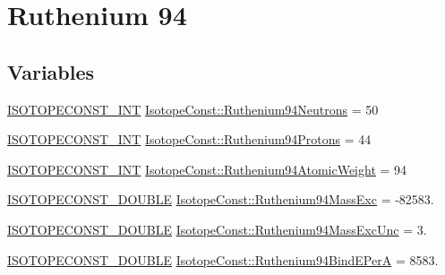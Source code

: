 \hypertarget{group___isotope_const-_ruthenium-_ru94}{}\section{Ruthenium 94}
\label{group___isotope_const-_ruthenium-_ru94}
\subsection*{Variables}
\begin{DoxyCompactItemize}
\item 
\mbox{\hyperlink{group___isotope_const-_macros_ga5f18360b3e99483a35c32d789e62621c}{I\+S\+O\+T\+O\+P\+E\+C\+O\+N\+S\+T\+\_\+\+I\+NT}} \mbox{\hyperlink{group___isotope_const-_ruthenium-_ru94_gad4b92330cacf5779d1186abbbd93e342}{Isotope\+Const\+::\+Ruthenium94\+Neutrons}} = 50
\item 
\mbox{\hyperlink{group___isotope_const-_macros_ga5f18360b3e99483a35c32d789e62621c}{I\+S\+O\+T\+O\+P\+E\+C\+O\+N\+S\+T\+\_\+\+I\+NT}} \mbox{\hyperlink{group___isotope_const-_ruthenium-_ru94_gac88748f72ea067de16aff702333e3f34}{Isotope\+Const\+::\+Ruthenium94\+Protons}} = 44
\item 
\mbox{\hyperlink{group___isotope_const-_macros_ga5f18360b3e99483a35c32d789e62621c}{I\+S\+O\+T\+O\+P\+E\+C\+O\+N\+S\+T\+\_\+\+I\+NT}} \mbox{\hyperlink{group___isotope_const-_ruthenium-_ru94_gada849ba17ad02c38a521cd3742804a36}{Isotope\+Const\+::\+Ruthenium94\+Atomic\+Weight}} = 94
\item 
\mbox{\hyperlink{group___isotope_const-_macros_ga8f45a7272ce02c0b4c65c44636ed719a}{I\+S\+O\+T\+O\+P\+E\+C\+O\+N\+S\+T\+\_\+\+D\+O\+U\+B\+LE}} \mbox{\hyperlink{group___isotope_const-_ruthenium-_ru94_ga1c1ffcb3022c1e093d4682718d335cbc}{Isotope\+Const\+::\+Ruthenium94\+Mass\+Exc}} = -\/82583.
\item 
\mbox{\hyperlink{group___isotope_const-_macros_ga8f45a7272ce02c0b4c65c44636ed719a}{I\+S\+O\+T\+O\+P\+E\+C\+O\+N\+S\+T\+\_\+\+D\+O\+U\+B\+LE}} \mbox{\hyperlink{group___isotope_const-_ruthenium-_ru94_ga996dfec7c8299e84caa3f5efbd4d9492}{Isotope\+Const\+::\+Ruthenium94\+Mass\+Exc\+Unc}} = 3.
\item 
\mbox{\hyperlink{group___isotope_const-_macros_ga8f45a7272ce02c0b4c65c44636ed719a}{I\+S\+O\+T\+O\+P\+E\+C\+O\+N\+S\+T\+\_\+\+D\+O\+U\+B\+LE}} \mbox{\hyperlink{group___isotope_const-_ruthenium-_ru94_gaea70058f31a8941525a05b17cfa8f1f9}{Isotope\+Const\+::\+Ruthenium94\+Bind\+E\+PerA}} = 8583.
\item 

\end{DoxyCompactItemize}

